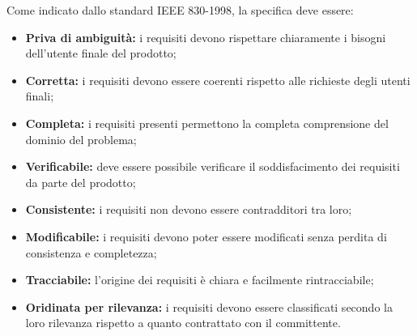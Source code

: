 \label{QualitàAnalisi}
Come indicato dallo standard IEEE 830-1998, la specifica deve essere:
\begin{itemize}
	\item \textbf{Priva di ambiguità:} i requisiti devono rispettare chiaramente i bisogni dell'utente finale del prodotto;
	\item \textbf{Corretta:} i requisiti devono essere coerenti rispetto alle richieste degli utenti finali;
	\item \textbf{Completa:} i requisiti presenti permettono la completa comprensione del dominio del problema;
	\item \textbf{Verificabile:} deve essere possibile verificare il soddisfacimento dei requisiti da parte del prodotto;
	\item \textbf{Consistente:} i requisiti non devono essere contradditori tra loro;
	\item \textbf{Modificabile:} i requisiti devono poter essere modificati senza perdita di consistenza e completezza;
	\item \textbf{Tracciabile:} l'origine dei requisiti è chiara e facilmente rintracciabile;
	\item \textbf{Oridinata per rilevanza:} i requisiti devono essere classificati secondo la loro rilevanza rispetto a quanto contrattato con il committente.
\end{itemize}